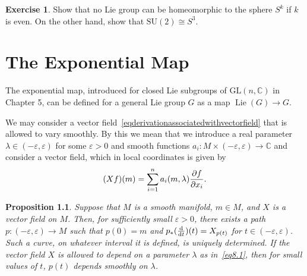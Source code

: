 \documentclass[12pt,reqno]{book}%
\newtheorem{proposition}{Proposition}[chapter]
\theoremstyle{definition}
\newtheorem{exercise}{Exercise}[chapter]
\theoremstyle{remark}
\theoremstyle{theorem}
\theoremstyle{remark}
\DeclareMathOperator{\Lie}{Lie}
\begin{document}
\begin{exercise}\label{}
    Show that no Lie group can be homeomorphic to the sphere $S^k$ if $k$ is even.
    On the other hand, show that $\mathrm{SU}(2) \cong S^3$.
\end{exercise}


\chapter{The Exponential Map}\label{}%
The exponential map, introduced for closed Lie subgroups of $\mathrm{GL}(n, \mathbb{C})$ in Chapter 5, can be defined for a general Lie group $G$ as a map $\Lie(G) \to G$.

We may consider a vector field~\eqref{eqderivationassociatedwithvectorfield} that is allowed to vary smoothly.
By this we mean that we introduce a real parameter $\lambda \in (-\varepsilon, \varepsilon)$ for some $\varepsilon > 0$ and smooth functions $a_i : M \times (-\varepsilon, \varepsilon) \to \mathbb{C}$ and consider a vector field, which in local coordinates is given by
\begin{equation}\label{eq8.1}
    (Xf)(m) = \sum_{i = 1}^{n} a_i(m, \lambda) \pdv{f}{x_i}(m).
\end{equation}

\begin{proposition}\label{prop8.1}%
    Suppose that $M$ is a smooth manifold, $m \in M$, and $X$ is a vector field on $M$.
    Then, for sufficiently small $\varepsilon > 0$, there exists a path $p : (-\varepsilon, \varepsilon) \to M$ such that $p(0) = m$ and $p_*(\dv{t})(t) = X_{p(t)}$ for $t \in (-\varepsilon, \varepsilon)$.
    Such a curve, on whatever interval it is defined, is uniquely determined.
    If the vector field $X$ is allowed to depend on a parameter $\lambda$ as in~\eqref{eq8.1}, then for small values of $t$, $p(t)$ depends smoothly on $\lambda$.
\end{proposition}%
\end{document}
